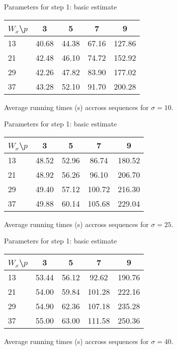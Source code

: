 \documentclass[mathserif, 8pt]{beamer}
\makeatletter
\newcounter{multipleslide}
\newcommand{\multipleframe}{%
\setcounter{multipleslide}{\value{framenumber}}
\stepcounter{multipleslide}
\patchcmd{\beamer@@tmpl@footline}%
	{\insertframenumber}%
	{\themultipleslide}%
	{}%
	{}%
}
\newcommand{\restoreframe}{%
\patchcmd{\beamer@@tmpl@footline}%
	{\themultipleslide}%
	{\insertframenumber}%
	{}%
	{}%
\setcounter{framenumber}{\value{multipleslide}}%
}
\makeatother
\begin{document}
\multipleframe
\begin{frame}{Parameters for step 1: basic estimate}
	\begin{center}
		\begin{tabular}{l | c c c c }
			 $W_x$\textbackslash $p$ & 3  & 5  & 7  & 9 \\\hline\hline
			 13 & 40.68 &  44.38 &  67.16 & 127.86 \\
			 21 & 42.48 &  46.10 &  74.72 & 152.92 \\
			 29 & 42.26 &  47.82 &  83.90 & 177.02 \\
			 37 & 43.28 &  52.10 &  91.70 & 200.28 \\
		\end{tabular}

		\bigskip

		Average running times (s) accross sequences for $\sigma = 10$.
	\end{center}
\end{frame}

\begin{frame}{Parameters for step 1: basic estimate}
	\begin{center}
		\begin{tabular}{l | c c c c }
			 $W_x$\textbackslash $p$ & 3  & 5  & 7  & 9 \\\hline\hline
			 13 & 48.52 &  52.96 &  86.74 & 180.52 \\
			 21 & 48.92 &  56.26 &  96.10 & 206.70 \\
			 29 & 49.40 &  57.12 & 100.72 & 216.30 \\
			 37 & 49.88 &  60.14 & 105.68 & 229.04 \\
		\end{tabular}

		\bigskip

		Average running times (s) accross sequences for $\sigma = 25$.
	\end{center}
\end{frame}

\begin{frame}{Parameters for step 1: basic estimate}
	\begin{center}
		\begin{tabular}{l | c c c c }
			 $W_x$\textbackslash $p$ & 3  & 5  & 7  & 9 \\\hline\hline
			 13 & 53.44 &  56.12 &  92.62 & 190.76 \\
			 21 & 54.00 &  59.84 & 101.28 & 222.16 \\
			 29 & 54.90 &  62.36 & 107.18 & 235.28 \\
			 37 & 55.00 &  63.00 & 111.58 & 250.36 \\
		\end{tabular}

		\bigskip

		Average running times (s) accross sequences for $\sigma = 40$.
	\end{center}
\end{frame}
\restoreframe
\end{document}
